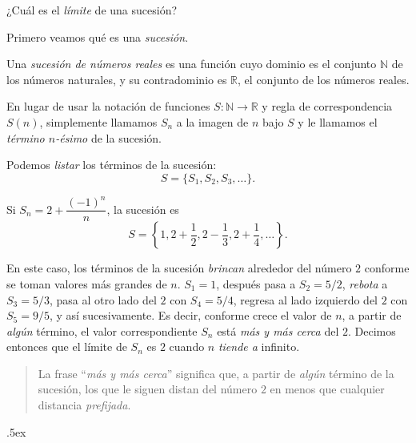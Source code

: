 \documentclass[12pt,letterpaper]{article}
\author{\textsc{Manuel López Mateos}}
\newcommand{\fej}{\relax\hfill\ifmmode{\lower.5ex\hbox{{\textcolor{blue}{\LARGE\smiley al 15pt}}}}\else\lower.5ex\hbox{{\textcolor{blue}{\LARGE \smiley}}}}  %
\newenvironment{definition}[1][Definición.]{\begin{trivlist}
\item[\hskip \labelsep {\bfseries #1}]}{\end{trivlist}}
\begin{document}
\bigskip 

\noindent ¿Cuál es el \emph{límite} de una sucesión?

\medskip
\noindent Primero veamos qué es una \emph{sucesión}.
\begin{definition}Una \emph{\color{purple}sucesión de números reales} es una función cuyo dominio es el conjunto $\mathbb N$ de los números naturales, y su contradominio es $\mathbb R$, el conjunto de los números reales. 
\end{definition}	
En lugar de usar la notación de funciones $S\colon \mathbb N \to \mathbb R$ y regla de correspondencia $S(n)$, simplemente llamamos $S_n$ a la imagen de $n$ bajo $S$ y le llamamos el \emph{\color{purple} término $n$-ésimo} de la sucesión.

Podemos \emph{listar} los términos de la sucesión:
$$S=\{S_1,S_2,S_3,\ldots\}.$$
	
Si $S_n=2+\dfrac{(-1)^n}{n}$, la sucesión es
$$S=\left\{1, 2+\frac{1}{2}, 2-\frac{1}{3}, 2+\frac{1}{4},\ldots\right\}.$$
	
En este caso, los términos de la sucesión \emph{brincan} alrededor del número $2$ conforme se toman valores más grandes de $n$. $S_1=1$, después pasa a $S_2=5/2$, \emph{rebota} a $S_3=5/3$, pasa al otro lado del $2$ con $S_4=5/4$, regresa al lado izquierdo del $2$ con $S_5=9/5$, y así sucesivamente. Es decir, conforme crece el valor de $n$, a partir de \emph{algún} término, el valor correspondiente $S_n$ está \emph{más y más cerca} del $2$. Decimos entonces que el límite de $S_n$ es $2$ cuando $n$ \emph{\color{purple}tiende a} infinito.

\begin{quotation}
	\noindent La frase \enquote{\emph{más y más cerca}} significa que, a partir de \emph{algún} término de la sucesión, los que le siguen distan del número $2$ en menos que cualquier distancia \emph{prefijada}.
\end{quotation}


\fej
\end{document}
